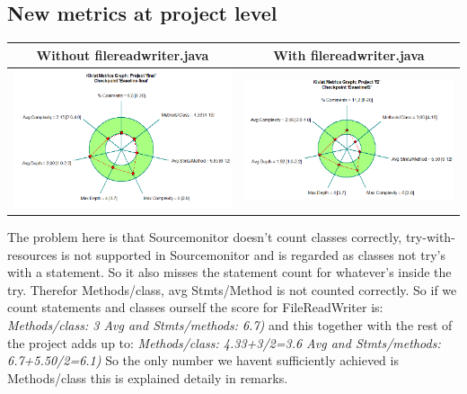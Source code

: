 \documentclass{article}
\begin{document}
\subsection{New metrics at project level} %
\hspace*{-0.5cm}
\begin{tabulary}{0.5\textwidth}{| c | c |}
 \hline
Without filereadwriter.java & With filereadwriter.java \\ \hline
\includegraphics[scale=0.4]{Project-after-with-filereadwriter.png} & \includegraphics[scale=0.4]{Kiviat-project-without-filereadwriter.png} \\ \hline
\end{tabulary}\vspace{0.2cm}

The problem here is that Sourcemonitor doesn't count classes correctly, try-with-resources is not supported in Sourcemonitor and is regarded as classes not try's with a statement. So it also misses the statement count for whatever's inside the try. Therefor Methods/class, avg Stmts/Method is not counted correctly. So if we count statements and classes ourself the score for FileReadWriter is:
\textit{Methods/class: 3 Avg and Stmts/methods: 6.7)} and this together with the rest of the project adds up to: \textit{Methods/class: 4.33+3/2=3.6 Avg and Stmts/methods: 6.7+5.50/2=6.1)}
So the only number we havent sufficiently achieved is Methods/class this is explained detaily in remarks.
\end{document}

